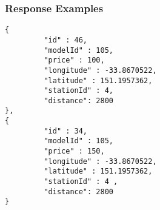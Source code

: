 \subsubsection{Response Examples}\label{response-examples}

\begin{verbatim}
{
         "id" : 46,
         "modelId" : 105,
         "price" : 100,
         "longitude" : -33.8670522,
         "latitude" : 151.1957362,
         "stationId" : 4,
         "distance": 2800
},
{
         "id" : 34,
         "modelId" : 105,
         "price" : 150,
         "longitude" : -33.8670522,
         "latitude" : 151.1957362,
         "stationId" : 4 ,
         "distance": 2800
}
\end{verbatim}

